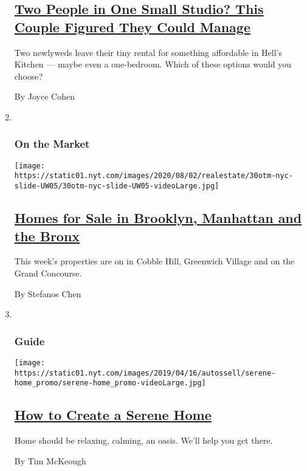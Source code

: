 \begin{enumerate}
  \hypertarget{two-people-in-one-small-studio-this-couple-figured-they-could-manage}{%
  \subsection{\texorpdfstring{\href{/interactive/2020/07/30/realestate/30hunt-sato.html}{Two
  People in One Small Studio? This Couple Figured They Could
  Manage}}{Two People in One Small Studio? This Couple Figured They Could Manage}}\label{two-people-in-one-small-studio-this-couple-figured-they-could-manage}}

  Two newlyweds leave their tiny rental for something affordable in
  Hell's Kitchen --- maybe even a one-bedroom. Which of these options
  would you choose?

  By Joyce Cohen
\item ~
  \hypertarget{on-the-market}{%
  \subsubsection{On the Market}\label{on-the-market}}

  \texttt{[image: https://static01.nyt.com/images/2020/08/02/realestate/30otm-nyc-slide-UW05/30otm-nyc-slide-UW05-videoLarge.jpg]}

  \hypertarget{homes-for-sale-in-brooklyn-manhattan-and-the-bronx}{%
  \subsection{\texorpdfstring{\href{/2020/07/30/realestate/homes-for-sale-in-brooklyn-manhattan-and-the-bronx.html}{Homes
  for Sale in Brooklyn, Manhattan and the
  Bronx}}{Homes for Sale in Brooklyn, Manhattan and the Bronx}}\label{homes-for-sale-in-brooklyn-manhattan-and-the-bronx}}

  This week's properties are on in Cobble Hill, Greenwich Village and on
  the Grand Concourse.

  By Stefanos Chen
\item ~
  \hypertarget{guide}{%
  \subsubsection{Guide}\label{guide}}

  \texttt{[image: https://static01.nyt.com/images/2019/04/16/autossell/serene-home\_promo/serene-home\_promo-videoLarge.jpg]}

  \hypertarget{how-to-create-a-serene-home}{%
  \subsection{\texorpdfstring{\href{/interactive/2019/05/15/smarter-living/serene-home.html}{How
  to Create a Serene
  Home}}{How to Create a Serene Home}}\label{how-to-create-a-serene-home}}

  Home should be relaxing, calming, an oasis. We'll help you get there.

  By Tim McKeough
\end{enumerate}

